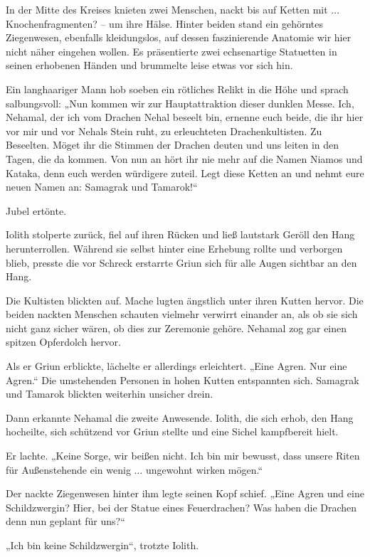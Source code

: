 In der Mitte des Kreises knieten zwei Menschen, nackt bis auf Ketten mit ... Knochenfragmenten? – um ihre Hälse. Hinter beiden stand ein gehörntes Ziegenwesen, ebenfalls kleidungslos, auf dessen faszinierende Anatomie wir hier nicht näher eingehen wollen. Es präsentierte zwei echsenartige Statuetten in seinen erhobenen Händen und brummelte leise etwas vor sich hin.

Ein langhaariger Mann hob soeben ein rötliches Relikt in die Höhe und sprach salbungsvoll: „Nun kommen wir zur Hauptattraktion dieser dunklen Messe. Ich, Nehamal, der ich vom Drachen Nehal beseelt bin, ernenne euch beide, die ihr hier vor mir und vor Nehals Stein ruht, zu erleuchteten Drachenkultisten. Zu Beseelten. Möget ihr die Stimmen der Drachen deuten und uns leiten in den Tagen, die da kommen. Von nun an hört ihr nie mehr auf die Namen Niamos und Kataka, denn euch werden würdigere zuteil. Legt diese Ketten an und nehmt eure neuen Namen an: Samagrak und Tamarok!“

Jubel ertönte.

Iolith stolperte zurück, fiel auf ihren Rücken und ließ lautstark Geröll den Hang herunterrollen. Während sie selbst hinter eine Erhebung rollte und verborgen blieb, presste die vor Schreck erstarrte Griun sich für alle Augen sichtbar an den Hang.

Die Kultisten blickten auf. Mache lugten ängstlich unter ihren Kutten hervor. Die beiden nackten Menschen schauten vielmehr verwirrt einander an, als ob sie sich nicht ganz sicher wären, ob dies zur Zeremonie gehöre. Nehamal zog gar einen spitzen Opferdolch hervor.

Als er Griun erblickte, lächelte er allerdings erleichtert. „Eine Agren. Nur eine Agren.“ Die umstehenden Personen in hohen Kutten entspannten sich. Samagrak und Tamarok blickten weiterhin unsicher drein.

Dann erkannte Nehamal die zweite Anwesende. Iolith, die sich erhob, den Hang hocheilte, sich schützend vor Griun stellte und eine Sichel kampfbereit hielt.

Er lachte. „Keine Sorge, wir beißen nicht. Ich bin mir bewusst, dass unsere Riten für Außenstehende ein wenig ... ungewohnt wirken mögen.“

Der nackte Ziegenwesen hinter ihm legte seinen Kopf schief. „Eine Agren und eine Schildzwergin? Hier, bei der Statue eines Feuerdrachen? Was haben die Drachen denn nun geplant für uns?“

„Ich bin keine Schildzwergin“, trotzte Iolith.

